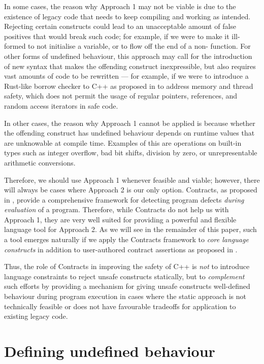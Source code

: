 In some cases, the reason why Approach 1 may not be viable is due to the existence of legacy code that needs to keep compiling and working as intended. Rejecting certain constructs could lead to an unacceptable amount of false positives that would break such code; for example, if we were to make it ill-formed to not initialise a variable, or to flow off the end of a non- function. For other forms of undefined behaviour, this approach may call for the introduction of new syntax that makes the offending construct inexpressible, but also requires vast amounts of code to be rewritten --- for example, if we were to introduce a Rust-like borrow checker to C++ as proposed in \cite{P3390R0} to address memory and thread safety, which does not permit the usage of regular pointers, references, and random access iterators in safe code.

In other cases, the reason why Approach 1 cannot be applied is because whether the offending construct has undefined behaviour depends on runtime values that are unknowable at compile time. Examples of this are operations on built-in types such as integer overflow, bad bit shifts, division by zero, or unrepresentable arithmetic conversions.

Therefore, we should use Approach 1 whenever feasible and viable; however, there will always be cases where Approach 2 is our only option. Contracts, as proposed in \cite{P2900R9}, provide a comprehensive framework for detecting program defects \emph{during evaluation} of a program. Therefore, while Contracts do not help us with Approach 1, they are very well suited for providing a powerful and flexible language tool for Approach 2. As we will see in the remainder of this paper, such a tool emerges naturally if we apply the Contracts framework to \emph{core language constructs} in addition to user-authored contract assertions as proposed in \cite{P2900R9}.

Thus, the role of Contracts in improving the safety of C++ is \emph{not} to introduce language constraints to reject unsafe constructs statically, but to \emph{complement} such efforts by providing a mechanism for giving unsafe constructs well-defined behaviour during program execution in cases where the static approach is not technically feasible or does not have favourable tradeoffs for application to existing legacy code.

\section{Defining undefined behaviour}

